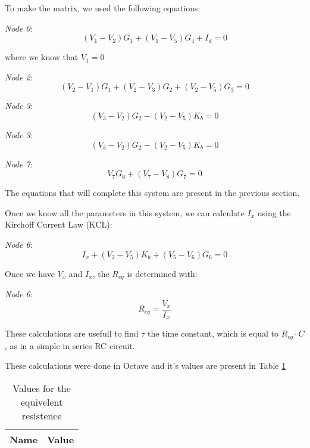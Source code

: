 To make the matrix, we used the following equations:


\textit{Node 0}:
\begin{equation}
  (V_{1} - V_{2})G_{1} + (V_{1} - V_{5})G_{4} + I_d = 0
\end{equation}

where we know that $V_1=0$

\textit{Node 2}:
\begin{equation}
  (V_{2} - V_{1})G_{1} + (V_{2} - V_{3})G_{2} + (V_{2} - V_{5})G_{3}= 0
\end{equation}

\textit{Node 3}:
\begin{equation}
  (V_{3} - V_{2})G_{2} - (V_{2} - V_{5})K_{b} = 0
\end{equation}

\textit{Node 3}:
\begin{equation}
  (V_{3} - V_{2})G_{2} - (V_{2} - V_{5})K_{b} = 0
\end{equation}

\textit{Node 7}:
\begin{equation}
  V_{7}G_{6} + (V_{7} - V_{8})G_{7} = 0
\end{equation}


The equations that will complete this system are present in the previous section.

Once we know all the parameters in this system, we can calculate $I_x$ using the Kirchoff Current Law (KCL):

\textit{Node 6}:
\begin{equation}
  I_{x} + (V_{2} - V_{5})K_{b} + (V_{5} - V_{6})G_{6} = 0
\end{equation}

Once we have $V_x$ and $I_x$, the $R_{eq}$ is determined with:


\textit{Node 6}:
\begin{equation}
  R_{eq} = \frac{V_x}{I_x}
\end{equation}

These calculations are usefull to find $\tau$ the time constant, which is equal to $R_{eq} \cdot C$, as in a simple in series RC circuit.

These calculations were done in Octave and it's values are present in Table \ref{tabReq}

\begin{table}[!ht]
  \centering
  \begin{tabular}{|l|r|}
    \hline    
    {\bf Name} & {\bf Value} \\ \hline
    
  \end{tabular}
  \caption{Values for the equivelent resistence}
  \label{tabReq}
\end{table}


